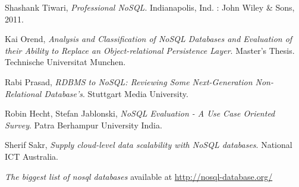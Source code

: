 \documentclass[times, 10pt,twocolumn]{article}
\begin{document}
\begin{thebibliography}{9}
  	  Shashank Tiwari, 
      \emph{Professional NoSQL}. Indianapolis, Ind. : John Wiley \& Sons, 2011.
      
  	  Kai Orend, 
      \emph{Analysis and Classification of NoSQL Databases and Evaluation of their Ability to Replace an Object-relational Persistence Layer}. Master's Thesis. Technische Universitat Munchen.
      
  	  Rabi Prasad, 
      \emph{RDBMS to NoSQL: Reviewing Some Next-Generation Non-Relational Database's}. Stuttgart Media University.
      
  	  Robin Hecht, Stefan Jablonski,
      \emph{NoSQL Evaluation - A Use Case Oriented Survey}. Patra Berhampur University India.
       
  	  Sherif Sakr, 
      \emph{Supply cloud-level data scalability with NoSQL databases}. National ICT Australia.
      
      \emph{The biggest list of nosql databases} available at
      \url{http://nosql-database.org/}

\end{thebibliography}
\end{document}

